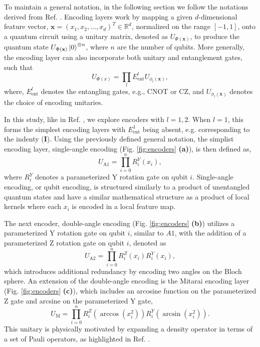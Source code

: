 \documentclass[journal=jacsat,manuscript=article]{achemso}
\begin{document}
To maintain a general notation, in the following section we follow the notations derived from  Ref. \citep{suzuki_predicting_2020}.
Encoding layers work by mapping a given $d$-dimensional feature vector, $\mathbf{x}=(x_{1}, x_{2}, \ldots, x_{d})^{T} \in \mathbb{R}^{d}$, normalized on the range $[-1,1]$, onto a quantum circuit using a unitary matrix, denoted as $U_{\Phi(\mathbf{x})}$, to produce the quantum state $U_{\Phi(\mathbf{x})}\ket{0}^{\otimes n}$, where $n$ are the number of qubits.
More generally, the encoding layer can also incorporate both unitary and entanglement gates, such that 
\begin{equation}
	U_{\Phi(x)} =  \prod_{l} E_{\text{ent}}^{l} U_{\phi_{l}(\mathbf{x})},
	\label{eq:general_encoding}
\end{equation}
where, $E_{\text{ent}}^{l}$ denotes the entangling gates, e.g., CNOT or CZ, and  $U_{\phi_{l}(\mathbf{x})}$ denotes the choice of encoding unitaries. 

In this study, like in Ref. \citep{suzuki_predicting_2020}, we explore encoders with $l={1,2}$. 
When $l=1$, this forms the simplest encoding layers with $E_{\text{ent}}^{1}$ being absent, e.g. corresponding to the indenty ($\mathbf{I}$). 
Using the previously defined general notation, the simplist encoding layer, single-angle encoding (Fig. \ref{fig:encoders} \textbf{(a)}), is then defined as,
\begin{equation}
	U_{\text{A1}} = \prod_{i=0}^{n} R^{Y}_{i}(x_{i}),
	\label{eq:A1}
\end{equation}
where $R^{Y}_{i}$ denotes a parameterized Y rotation gate on qubit $i$.
Single-angle encoding, or qubit encoding, is structured similarly to a product of unentangled quantum states and have a similar mathematical structure as a product of local kernels where each $x_{i}$ is encoded in a local feature map.\cite{stoudenmire_supervised_2016,benedetti_parameterized_2019}

The next encoder, double-angle encoding (Fig. \ref{fig:encoders} \textbf{(b)}) utilizes a parameterized Y rotation gate on qubit $i$, similar to $A1$, with the addition of a parameterized Z rotation gate on qubit $i$, denoted as
\begin{equation}
	U_{\text{A2}} = \prod_{i=0}^{n}  R^{Z}_{i}(x_{i}) R^{Y}_{i}(x_{i}),
	\label{eq:A2}
\end{equation}
which introduces additional redundancy by encoding two angles on the Bloch sphere.
An extension of the double-angle encoding is the Mitarai encoding layer (Fig. \ref{fig:encoders} \textbf{(c)}), which includes an arcosine function on the parameterized Z gate and arcsine on the parameterized Y gate,
\begin{equation}
	U_{\text{M}}  = \prod_{i=0}^{n} R^{Z}_{i}(\arccos (x_{i}^{2})) R^{Y}_{i}(\arcsin (x_{i}^{2})).
	\label{eq:M}
\end{equation}
This unitary is physically motivated by expanding a density operator in terms of a set of Pauli operators, as highlighted in Ref. \cite{mitarai_quantum_2018}.
\end{document}
